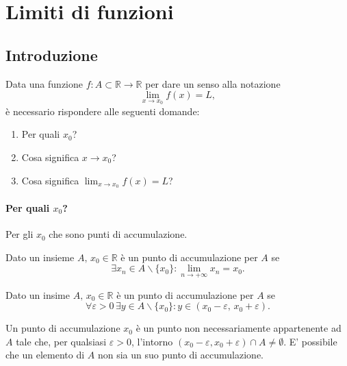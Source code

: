 \section{Limiti di funzioni}

\subsection{Introduzione}

Data una funzione $f\colon A\subset\mathbb R\rightarrow\mathbb R$ per dare un senso alla notazione
\begin{equation*}
    \lim_{x\rightarrow x_0}f(x)=L,
\end{equation*}
è necessario rispondere alle seguenti domande:
\begin{enumerate}
    \item Per quali $x_0$?
    \item Cosa significa $x\rightarrow x_0$?
    \item Cosa significa $\lim_{x\rightarrow x_0}f(x)=L$?
\end{enumerate}

\paragraph{Per quali $x_0$?}
Per gli $x_0$ che sono punti di accumulazione.

\begin{definition}
    Dato un insieme $A,\, x_0\in\mathbb R$ è un punto di accumulazione per $A$ se
    \begin{equation*}
        \exists x_n\in A\backslash\{x_0\}\colon\lim_{n\rightarrow+\infty} x_n=x_0. 
    \end{equation*}
\end{definition}

\begin{definition}
    Dato un insime $A,\, x_0\in\mathbb R$ è un punto di accumulazione per $A$ se
    \begin{equation*}
        \forall\varepsilon >0\,\exists y\in A\backslash\{x_0\}\colon y\in(x_0-\varepsilon,\, x_0+\varepsilon).
    \end{equation*}
\end{definition}

Un punto di accumulazione $x_0$ è un punto non necessariamente appartenente ad $A$ tale che, per qualsiasi $\varepsilon>0$, l'intorno $(x_0-\varepsilon,x_0+\varepsilon)\cap A\neq\emptyset$. E' possibile che un elemento di $A$ non sia un suo punto di accumulazione.

